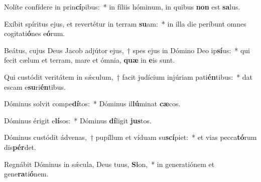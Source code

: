 \item Nolíte confídere in prin\textbf{cí}pibus:~* in fíliis hóminum, in quibus \textbf{non} est \textbf{sa}lus.
\item Exíbit spíritus ejus, et revertétur in terram \textbf{su}am:~* in illa die períbunt omnes cogitati\textbf{ó}nes e\textbf{ó}rum.
\item Beátus, cujus Deus Jacob adjútor ejus,~† spes ejus in Dómino Deo ip\textbf{sí}us:~* qui fecit cælum et terram, mare et ómnia, \textbf{quæ} in \textbf{e}is sunt.
\item Qui custódit veritátem in sǽculum,~† facit judícium injúriam pati\textbf{én}tibus:~* dat escam e\textbf{su}ri\textbf{én}tibus.
\item Dóminus solvit compe\textbf{dí}tos:~* Dóminus il\textbf{lú}minat \textbf{cæ}cos.
\item Dóminus érigit e\textbf{lí}sos:~* Dóminus \textbf{dí}ligit \textbf{jus}tos.
\item Dóminus custódit ádvenas,~† pupíllum et víduam su\textbf{scí}piet:~* et vias pecca\textbf{tó}rum dis\textbf{pér}det.
\item Regnábit Dóminus in sǽcula, Deus tuus, \textbf{Si}on,~* in generatiónem et gene\textbf{ra}ti\textbf{ó}nem.
